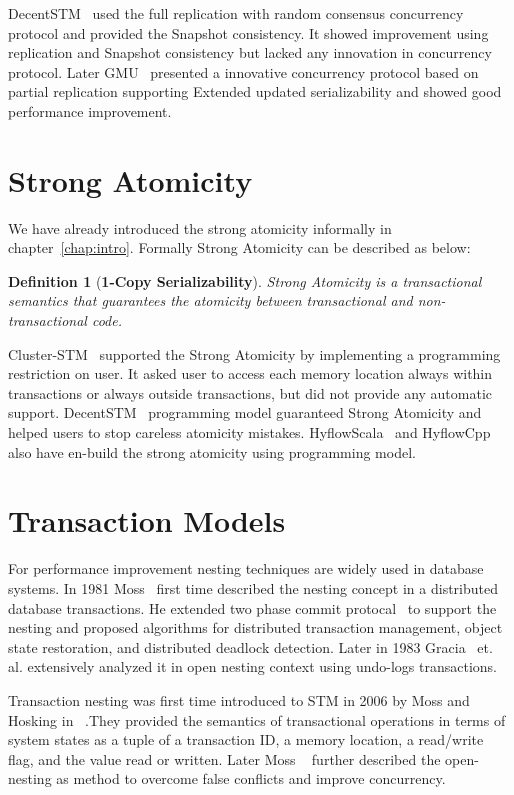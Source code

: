 \documentclass[12pt,english]{report}
\newtheorem{definition}{Definition}[section]
\begin{document}
DecentSTM~\cite{DecentSTM:5470446} used the full replication with random consensus concurrency protocol and provided the  Snapshot consistency. It showed improvement using replication and Snapshot consistency but lacked any innovation in concurrency protocol. Later GMU~\cite{GMU:peluso2012scalability} presented a innovative concurrency protocol based on partial replication supporting Extended updated serializability and showed good performance improvement. 

\section{Strong Atomicity}
We have already introduced the strong atomicity informally in chapter~\ref{chap:intro}. Formally Strong Atomicity can be described as below:

\begin{definition}[\textbf{1-Copy Serializability}] 
Strong Atomicity is a transactional semantics that guarantees the atomicity between transactional and non-transactional code.
\end{definition}

Cluster-STM~\cite{Bocchino:2008:STM:1345206.1345242} supported the Strong Atomicity by implementing a programming restriction on user. It asked user to access each memory location always within transactions or always outside transactions, but did not provide any automatic support. DecentSTM~\cite{DecentSTM:5470446} programming model guaranteed Strong Atomicity and helped users to stop careless atomicity mistakes. HyflowScala~\cite{turcuhyflow2} and HyflowCpp also have en-build the strong atomicity using programming model.

\section{Transaction Models}

For performance improvement nesting techniques are widely used in database systems. In 1981 Moss~\cite{moss1981nested} first time described the nesting concept in a distributed database transactions. He extended two phase commit protocal~\cite{TwoPC:weikum1991principles} to support the nesting and proposed algorithms for distributed transaction management, object state restoration, and distributed deadlock detection. Later in 1983 Gracia~\cite{garcia1983using} et. al. extensively analyzed it in open nesting context using undo-logs transactions. 

Transaction nesting was first time introduced to STM in 2006 by  Moss and Hosking in ~\cite{moss2006nested}.They provided the semantics of transactional operations in terms of system states as a tuple of a transaction ID, a memory location, a read/write flag, and the value read or written. Later Moss ~\cite{moss2006open} further described the open-nesting as method to overcome false conflicts and improve concurrency. 
\end{document}
